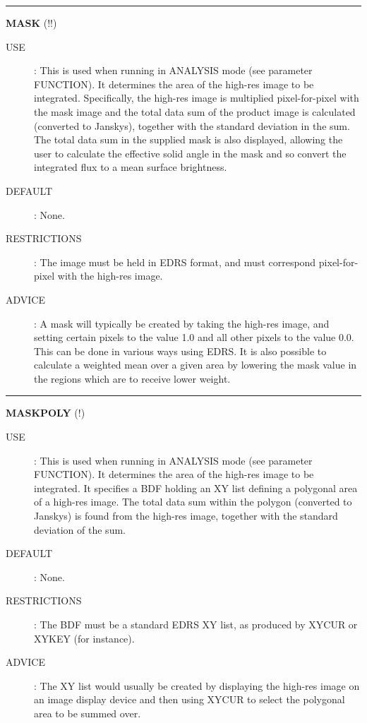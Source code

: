 \rule{\textwidth}{0.3mm}
{\Large {\bf MASK } (!!)}
\begin{description}
\item [USE]:
This is used when running in ANALYSIS mode (see parameter FUNCTION). It
determines the area of the high-res image to be integrated. Specifically, the
high-res image is multiplied pixel-for-pixel with the mask image and the total
data sum of the product image is calculated (converted to Janskys), together
with the standard deviation in the sum. The total data sum in the supplied mask
is also displayed, allowing the user to calculate the effective solid angle in
the mask and so convert the integrated flux to a mean surface brightness.

\item [DEFAULT]:
None.
\item [RESTRICTIONS]:
The image must be held in EDRS format, and must correspond pixel-for-pixel with
the high-res image.
\item [ADVICE]:
A mask will typically be created by taking the high-res image, and setting
certain pixels to the value 1.0 and all other pixels to the value 0.0. This can
be done in various ways using EDRS. It is also possible to calculate a weighted
mean over a given area by lowering the mask value in the regions which are to
receive lower weight.
\end {description}

\rule{\textwidth}{0.3mm}
{\Large {\bf MASKPOLY } (!)}
\begin{description}
\item [USE]:
This is used when running in ANALYSIS mode (see parameter FUNCTION). It
determines the area of the high-res image to be integrated.
It specifies a BDF holding an XY list defining a polygonal area of a high-res
image. The total data sum within the polygon (converted to Janskys) is found
from the high-res image, together with the standard deviation of the sum.
\item [DEFAULT]:
None.
\item [RESTRICTIONS]:
The BDF must be a standard EDRS XY list, as produced by XYCUR or XYKEY (for
instance).
\item [ADVICE]:
The XY list would usually be created by displaying the high-res image on an
image display device and then using XYCUR to select the polygonal area to be
summed over.
\end {description}

